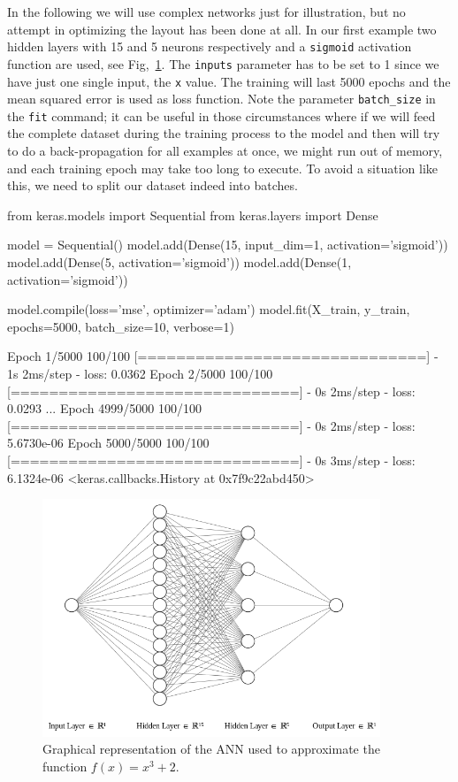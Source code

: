 In the following we will use complex networks just for illustration, but no attempt in optimizing the layout has been done at all.
In our first example two hidden layers with 15 and 5 neurons respectively and a \texttt{sigmoid} activation function are used, see Fig,~\ref{fig:ann_1}. The \texttt{inputs} parameter has to be set to 1 since we have just one single input, the \texttt{x} value.
The training will last 5000 epochs and the mean squared error is used as loss function. Note the parameter \texttt{batch\_size} in the \texttt{fit} command; it can be useful in those circumstances where if we will feed the complete dataset during the training process to the model and then will try to do a back-propagation for all examples at once, we might run out of memory, and each training epoch may take too long to execute. To avoid a situation like this, we need to split our dataset indeed into batches.

\begin{ipython}
from keras.models import Sequential
from keras.layers import Dense

model = Sequential()
model.add(Dense(15, input_dim=1, activation='sigmoid'))
model.add(Dense(5, activation='sigmoid'))
model.add(Dense(1, activation='sigmoid'))

model.compile(loss='mse', optimizer='adam')
model.fit(X_train, y_train, epochs=5000, batch_size=10, verbose=1)
\end{ipython}
\begin{ioutput}
Epoch 1/5000
100/100 [==============================] - 1s 2ms/step - loss: 0.0362
Epoch 2/5000
100/100 [==============================] - 0s 2ms/step - loss: 0.0293
...
Epoch 4999/5000
100/100 [==============================] - 0s 2ms/step - loss: 5.6730e-06
Epoch 5000/5000
100/100 [==============================] - 0s 3ms/step - loss: 6.1324e-06
<keras.callbacks.History at 0x7f9c22abd450>
\end{ioutput}

\begin{figure}[htb]
\centering
\includegraphics[width=0.9\textwidth]{figures/ann_1.png}
\caption{Graphical representation of the ANN used to approximate the function $f(x) = x^3 + 2$.}
\label{fig:ann_1}
\end{figure}

